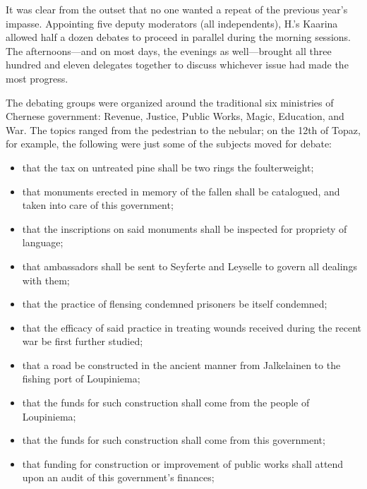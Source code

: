 \documentclass[12pt]{report}
\begin{document}
It was clear from the outset that no one wanted a repeat of the
previous year's impasse.  Appointing five deputy moderators (all
independents), H.'s Kaarina allowed half a dozen debates to proceed in
parallel during the morning sessions.  The afternoons---and on most
days, the evenings as well---brought all three hundred and eleven
delegates together to discuss whichever issue had made the most
progress.

The debating groups were organized around the traditional six
ministries of Chernese government: Revenue, Justice, Public Works,
Magic, Education, and War.  The topics ranged from the pedestrian to
the nebular; on the 12th of Topaz, for example, the following were
just some of the subjects moved for debate:

\begin{itemize}

\item that the tax on untreated pine shall be two rings the
foulterweight;

\item that monuments erected in memory of the fallen shall be
catalogued, and taken into care of this government;

\item that the inscriptions on said monuments shall be inspected for
propriety of language;

\item that ambassadors shall be sent to Seyferte and Leyselle to
govern all dealings with them;

\item that the practice of flensing condemned prisoners be itself
condemned;

\item that the efficacy of said practice in treating wounds received
during the recent war be first further studied;

\item that a road be constructed in the ancient manner from
Jalkelainen to the fishing port of Loupiniema;

\item that the funds for such construction shall come from the people
of Loupiniema;

\item that the funds for such construction shall come from this
government;

\item that funding for construction or improvement of public works
shall attend upon an audit of this government's finances;


\end{itemize}
\end{document}
